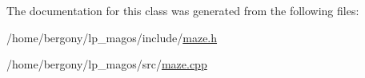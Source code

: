 The documentation for this class was generated from the following files\+:\begin{DoxyCompactItemize}
\item 
/home/bergony/lp\+\_\+magos/include/\hyperlink{maze_8h}{maze.\+h}\item 
/home/bergony/lp\+\_\+magos/src/\hyperlink{maze_8cpp}{maze.\+cpp}\end{DoxyCompactItemize}
